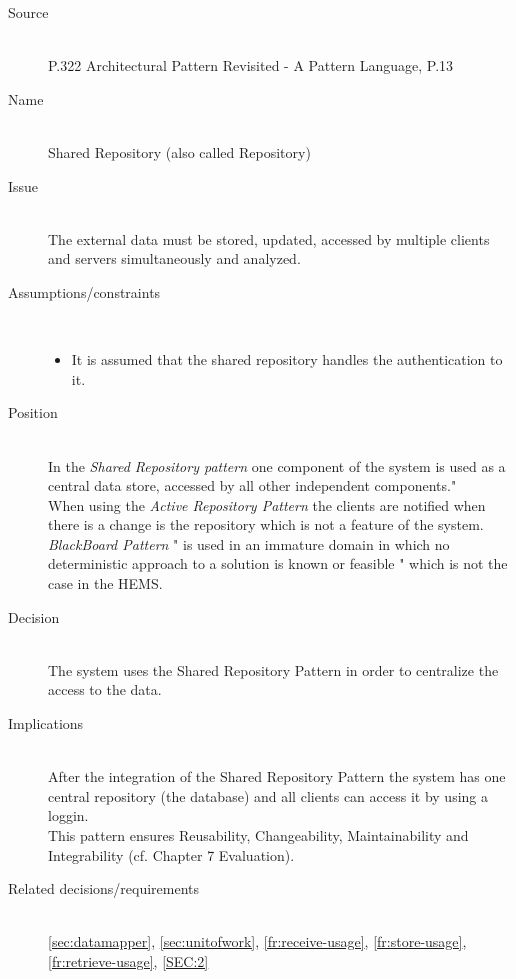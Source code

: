 \begin{description}
\item [Source]~\\

\EAA P.322 \cite{eaa}
Architectural Pattern Revisited - A Pattern Language, P.13 \cite{avgeriou2005architectural}

 \item [Name] ~\\ 
 Shared Repository (also called Repository)
 \item [Issue]~ \\
  The external data must be stored, updated, accessed by multiple clients and servers simultaneously and analyzed.
 \item [Assumptions/constraints]~
 \begin{itemize}
 \item It is assumed that the shared repository handles the authentication to it.
 \end{itemize}
 \item [Position]~ \\ 
 In the \textit{Shared Repository pattern} one component of the system is used as a central data store, accessed by all other independent components."\\
 When using the \textit{Active Repository Pattern} the clients are notified when there is a change is the repository which is not a feature of the system.\\
 \textit{BlackBoard Pattern} " is used in an immature domain in which no deterministic approach to a solution is known or feasible " which is not the case in the HEMS. \\
 \item [Decision]~\\ 
 The system uses the Shared Repository Pattern in order to centralize the access to the data.\\
 \item [Implications]~ \\ 
 After the integration of the Shared Repository Pattern the system has one central repository (the database) and all clients can access it by using a loggin. \\
  This pattern ensures Reusability, Changeability, Maintainability and Integrability (cf. Chapter 7 Evaluation). \\
\item [Related decisions/requirements]~\\ 
\ref{sec:datamapper}, \ref{sec:unitofwork}, \ref{fr:receive-usage}, \ref{fr:store-usage}, \ref{fr:retrieve-usage}, \ref{SEC:2} \\


\end{description}
